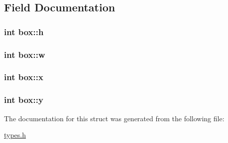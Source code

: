 \subsection{Field Documentation}
\hypertarget{structbox_ae5f43093fed8b18ac0522637c943893e}{
\subsubsection[{h}]{\setlength{\rightskip}{0pt plus 5cm}int {\bf box::h}}}
\label{structbox_ae5f43093fed8b18ac0522637c943893e}
\hypertarget{structbox_a1367e1dd702ef9e50705487f58b37e24}{
\subsubsection[{w}]{\setlength{\rightskip}{0pt plus 5cm}int {\bf box::w}}}
\label{structbox_a1367e1dd702ef9e50705487f58b37e24}
\hypertarget{structbox_acf85d53da6b371cb8d0a8fdddf2c64f5}{
\subsubsection[{x}]{\setlength{\rightskip}{0pt plus 5cm}int {\bf box::x}}}
\label{structbox_acf85d53da6b371cb8d0a8fdddf2c64f5}
\hypertarget{structbox_af61536fdadb10ddcb4a5a0bda9348525}{
\subsubsection[{y}]{\setlength{\rightskip}{0pt plus 5cm}int {\bf box::y}}}
\label{structbox_af61536fdadb10ddcb4a5a0bda9348525}


The documentation for this struct was generated from the following file:\begin{DoxyCompactItemize}
\item 
\hyperlink{types_8h}{types.h}\end{DoxyCompactItemize}
